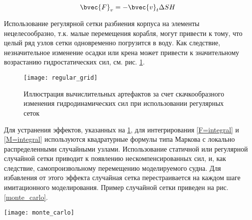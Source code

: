 \begin{equation}
	\bvec{F}_v = -\bvec{v}_t \Delta S H
\end{equation}





Использование регулярной сетки разбиения корпуса на элементы нецелесообразно, т.к. малые перемещения корабля, могут привести к тому, что целый ряд узлов сетки одновременно погрузится в воду. Как следствие, незначительное изменение осадки или крена может привести к значительному возрастанию гидростатических сил, см. рис. \ref{regular_grid}.

\begin{figure}[ht]
\begin{center}
\texttt{[image: regular\_grid]}
\end{center}
\caption{Иллюстрация вычислительных артефактов за счет скачкообразного изменения гидродинамических сил при использовании регулярных сеток}
\label{regular_grid}
\end{figure}

Для устранения эффектов, указанных на \ref{regular_grid}, для интегрирования \eqref{F=integral} и \eqref{M=integral} используются квадратурные формулы типа Маркова с локально распределенными случайными узлами. Использование статичной или регулярной случайной сетки приводит к появлению нескомпенсированных сил, и, как следствие, самопроизвольному перемещению моделируемого судна. Для избавления от этого эффекта случайная сетка перестраивается на каждом шаге имитационного моделирования. Пример случайной сетки приведен на рис. \ref{monte_carlo}.

\begin{sidewaysfigure}[ht]
\begin{center}
\texttt{[image: monte\_carlo]}
\end{center}
\caption{Пример сетки с локально-распределенными случайными узлами}
\label{monte_carlo}
\end{sidewaysfigure}

